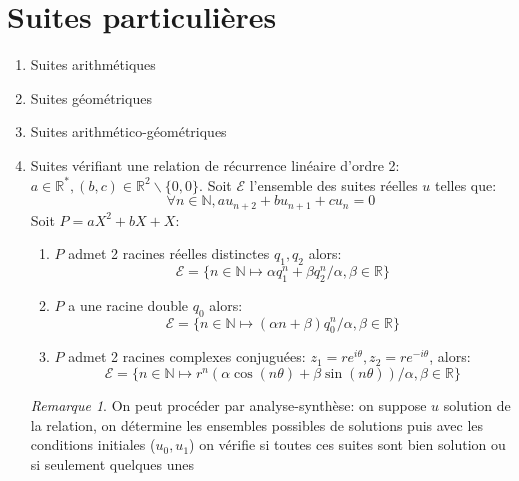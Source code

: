 \documentclass[fleqn]{article}
\theoremstyle{definition} \newtheorem*{defi}{D\'efinition}
\theoremstyle{definition} \newtheorem*{theo}{Th\'eor\`eme}
\theoremstyle{definition} \newtheorem*{prop}{Propri\'et\'e}
\theoremstyle{definition} \newtheorem*{coro}{Corollaire}
\theoremstyle{remark} \newtheorem*{rqs}{Remarque}
\begin{document}
\section{Suites particuli\`eres}
\begin{enumerate}
	\item Suites arithm\'etiques
	\item Suites g\'eom\'etriques
	\item Suites arithm\'etico-g\'eom\'etriques
	\item Suites v\'erifiant une relation de r\'ecurrence lin\'eaire d'ordre 2: \\
		$a \in \mathbb{R}^*, (b,c) \in \mathbb{R}^2\backslash\{0,0\}$. Soit $\mathscr{E}$ l'ensemble des suites r\'eelles $u$ telles que:
		\[\forall n \in \mathbb{N}, au_{n+2} + bu_{n+1} + cu_n = 0\]
		Soit $P = aX^2 + bX + X$:
		\begin{enumerate}
			\item $P$ admet 2 racines r\'eelles distinctes $q_1, q_2$ alors:
				\[\mathscr{E} = \{n \in \mathbb{N} \mapsto \alpha q_1^n + \beta q_2^n / \alpha, \beta \in \mathbb{R}\}\]
			\item $P$ a une racine double $q_0$ alors:
				\[\mathscr{E} = \{n \in \mathbb{N} \mapsto (\alpha n + \beta) q_0^n / \alpha, \beta \in \mathbb{R}\}\]
			\item $P$ admet 2 racines complexes conjugu\'ees: $z_1 = re^{i\theta}, z_2 = re^{-i\theta}$, alors:
				\[\mathscr{E} = \{n \in \mathbb{N} \mapsto r^n(\alpha \cos(n\theta) + \beta \sin(n\theta)) / \alpha, \beta \in \mathbb{R}\}\]
		\end{enumerate}
		\begin{rqs}
			On peut proc\'eder par analyse-synth\`ese: on suppose $u$ solution de la relation, on d\'etermine les ensembles possibles de
			solutions puis avec les conditions initiales ($u_0, u_1$) on v\'erifie si toutes ces suites sont bien solution ou si seulement
			quelques unes
		\end{rqs}
\end{enumerate}
\end{document}
